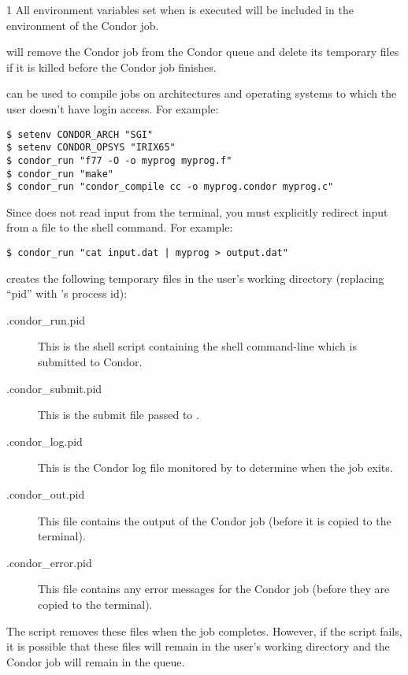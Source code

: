 \begin{ManPage}{\label{man-condor-run}}{1}
All environment variables set when  is executed will be
included in the environment of the Condor job.

 will remove the Condor job from the Condor queue and
delete its temporary files if it is killed before the Condor job
finishes.

\Examples

 can be used to compile jobs on architectures and
operating systems to which the user doesn't have login access.  For example:

\begin{verbatim}
$ setenv CONDOR_ARCH "SGI"
$ setenv CONDOR_OPSYS "IRIX65"
$ condor_run "f77 -O -o myprog myprog.f"
$ condor_run "make"
$ condor_run "condor_compile cc -o myprog.condor myprog.c"
\end{verbatim}

Since  does not read input from the terminal, you must
explicitly redirect input from a file to the shell command.  For
example:

\begin{verbatim}
$ condor_run "cat input.dat | myprog > output.dat"
\end{verbatim}

\Files

 creates the following temporary files in the user's
working directory (replacing ``pid'' with 's process id):
\begin{description}
\item[.condor\_run.pid] This is the shell script containing the shell
command-line which is submitted to Condor.
\item[.condor\_submit.pid] This is the submit file passed to
. 
\item[.condor\_log.pid] This is the Condor log file monitored by
 to determine when the job exits.
\item[.condor\_out.pid] This file contains the output of the Condor
job (before it is copied to the terminal).
\item[.condor\_error.pid] This file contains any error messages for the Condor
job (before they are copied to the terminal).
\end{description}
The script removes these files when the job completes.  However, if
the script fails, it is possible that these files will remain in the
user's working directory and the Condor job will remain in the queue.

\GenRem


\end{ManPage}
